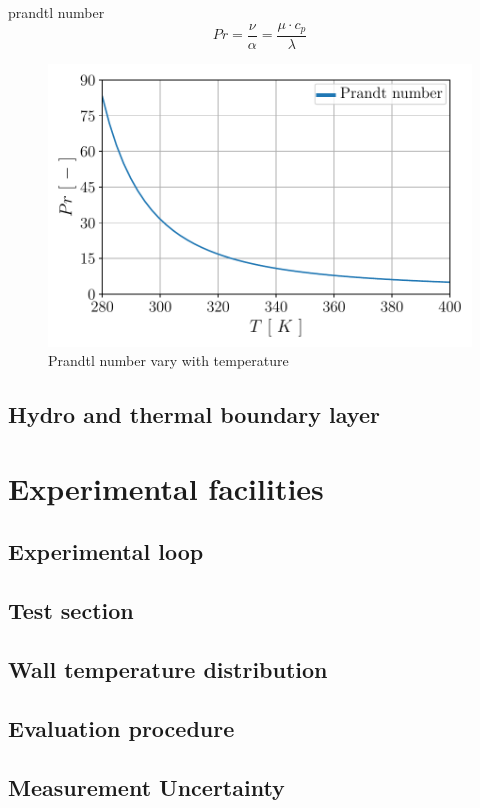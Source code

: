 \documentclass[12pt,oneside]{jbook}
\begin{document}
prandtl number
\begin{equation}
	Pr = \frac{\nu}{\alpha}= \frac{\mu \cdot c_{p}}{\lambda}
	\label{pr}
\end{equation}
\begin{figure}[ht]
	\vspace{0zh}
	\begin{center}
		\includegraphics[width=0.65\linewidth]{fig/pr.pdf}
		\vspace{-1zh}
		\caption{Prandtl number vary with temperature}
		\label{pr}
	\end{center}
	\vspace{0zh}
\end{figure}

\clearpage
\section{Hydro and thermal boundary layer}

\chapter{Experimental facilities}
\section{Experimental loop}
\section{Test section}
\section{Wall temperature distribution}
\section{Evaluation procedure}
\section{Measurement Uncertainty}
\end{document}
